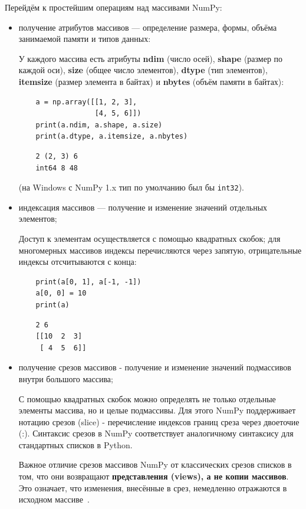 \documentclass[pract]{SCWorks}
\begin{document}
Перейдём к простейшим операциям над массивами NumPy:

\begin{itemize}
        \item получение атрибутов массивов --- определение размера, формы, объёма занимаемой памяти и типов данных:

    У каждого массива есть атрибуты \textbf{ndim} (число осей), \textbf{shape} (размер по каждой оси),
    \textbf{size} (общее число элементов), \textbf{dtype} (тип элементов), \textbf{itemsize} (размер элемента
    в байтах) и \textbf{nbytes} (объём памяти в байтах):

    \begin{verbatim}
    a = np.array([[1, 2, 3],
                  [4, 5, 6]])
    print(a.ndim, a.shape, a.size)
    print(a.dtype, a.itemsize, a.nbytes)
    \end{verbatim}

    \begin{verbatim}
    2 (2, 3) 6
    int64 8 48
    \end{verbatim}

    (на Windows с NumPy 1.x тип по умолчанию был бы \texttt{int32}).

    \item индексация массивов --- получение и изменение значений отдельных элементов;

    Доступ к элементам осуществляется с помощью квадратных скобок; для многомерных массивов индексы
    перечисляются через запятую, отрицательные индексы отсчитываются с конца:

    \begin{verbatim}
    print(a[0, 1], a[-1, -1])
    a[0, 0] = 10
    print(a)
    \end{verbatim}

    \begin{verbatim}
    2 6
    [[10  2  3]
     [ 4  5  6]]
    \end{verbatim}
    \item получение срезов массивов - получение и изменение значений подмассивов внутри большого массива;

    С помощью квадратных скобок можно определять не только отдельные элементы массива, но и целые подмассивы. 
    Для этого NumPy поддерживает нотацию срезов (slice) - перечисление индексов границ среза через двоеточие (:). 
    Синтаксис срезов в NumPy соответствует аналогичному синтаксису для стандартных списков в Python.

    Важное отличие срезов массивов NumPy от классических срезов списков в том, что они возвращают \textbf{представления 
    (views), а не копии массивов}. Это означает, что изменения, внесённые в срез, немедленно отражаются в исходном массиве~\cite{vanderplas}.
    

\end{itemize}
\end{document}
